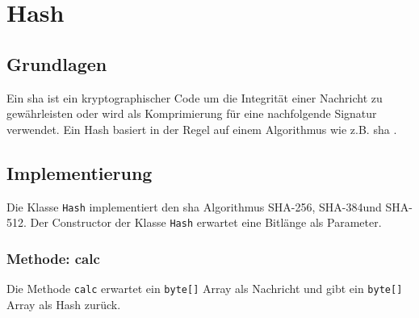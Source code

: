 \chapter{Hash}
\label{chap:hash}

\section{Grundlagen}
Ein \gls{sha} ist ein kryptographischer Code um die Integrität einer Nachricht zu gewährleisten oder wird als Komprimierung für eine nachfolgende Signatur verwendet. Ein Hash basiert in der Regel auf einem Algorithmus wie z.B. \gls{sha} \cite{rfc6234}.

\section{Implementierung}
Die Klasse \texttt{Hash} implementiert den \gls{sha} Algorithmus \glqq SHA-256\grqq, \glqq SHA-384\grqq und \glqq SHA-512\grqq.
Der Constructor der Klasse \texttt{Hash} erwartet eine Bitlänge als Parameter.

\subsection{Methode: calc}
Die Methode \texttt{calc} erwartet ein \texttt{byte[]} Array als Nachricht und gibt ein \texttt{byte[]} Array als Hash zurück.
